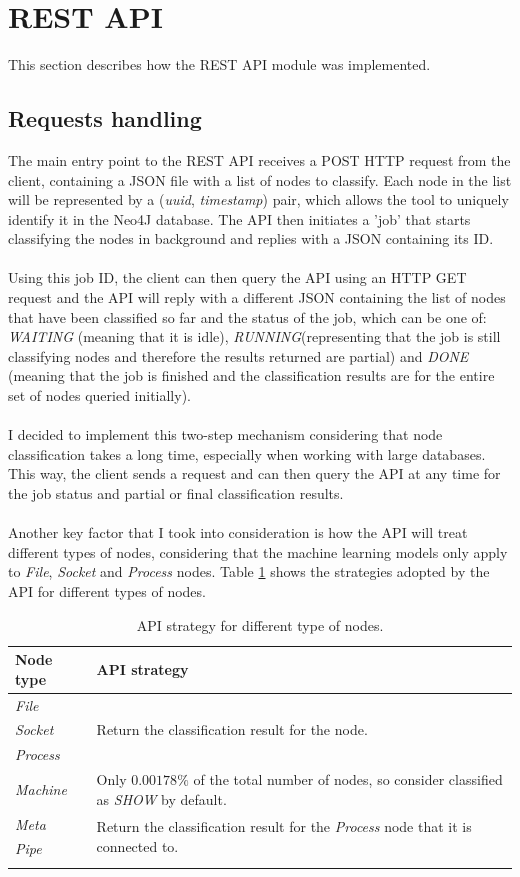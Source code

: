 	\section{REST API} \label{Section: impl/REST}
	This section describes how the REST API module was implemented.
	\subsection{Requests handling} \label{Section: impl/REST/actual}
	The main entry point to the REST API receives a POST HTTP request from the client, containing a JSON file with a list of nodes to classify. Each node in the list will be represented by a (\textit{uuid}, \textit{timestamp}) pair, which allows the tool to uniquely identify it in the Neo4J database. The API then initiates a 'job' that starts classifying the nodes in background and replies with a JSON containing its ID.
	\\ \\
	Using this job ID, the client can then query the API using an HTTP GET request and the API will reply with a different JSON containing the list of nodes that have been classified so far and the status of the job, which can be one of: \textit{WAITING} (meaning that it is idle), \textit{RUNNING}(representing that the job is still classifying nodes and therefore the results returned are partial) and \textit{DONE} (meaning that the job is finished and the classification results are for the entire set of nodes queried initially). 
	\\ \\
	I decided to implement this two-step mechanism considering that node classification takes a long time, especially when working with large databases. This way, the client sends a request and can then query the API at any time for the job status and partial or final classification results. 
	\\ \\
	Another key factor that I took into consideration is how the API will treat different types of nodes, considering that the machine learning models only apply to \textit{File}, \textit{Socket} and \textit{Process} nodes. Table \ref{Table: impl/REST/API-strategy} shows the strategies adopted by the API for different types of nodes.
	\begin{longtable}{|p{}|p{}|}
		\textbf{Node type} & \textbf{API strategy} \\
		\hline
		\textit{File} & \multirow{3}{*}{Return the classification result for the node.} \\
		\textit{Socket} & \\
		\textit{Process} & \\
		\hline
		\textit{Machine} & Only $0.00178\%$ of the total number of nodes, so consider classified as \textit{SHOW} by default. \\
		\hline
		\textit{Meta} & \multirow{2}{*}{Return the classification result for the \textit{Process} node that it is connected to.} \\
		\textit{Pipe} & \\
		\hline
		\caption{API strategy for different type of nodes.}
		\label{Table: impl/REST/API-strategy}
 	\end{longtable}
 
